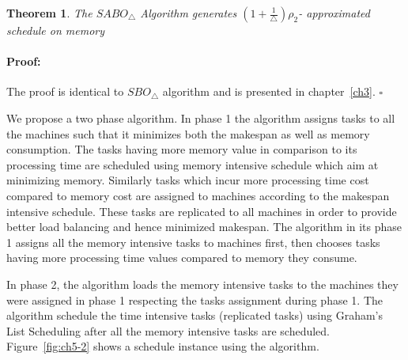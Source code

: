 \documentclass[12pt]{article}
\theoremstyle{mystyle}
\newtheorem{theorem}{Theorem}
\newenvironment{myproof}{\paragraph{Proof:}}{\hfill$\square$}
\begin{document}
      \begin{theorem} \label{th:chapter5-2b}
        The $SABO_\triangle$ Algorithm generates $ (1+\frac{1}{\triangle})\rho_2 $- approximated schedule on memory 
         \end{theorem}                      
         \begin{myproof}  
         The proof is identical to $SBO_\triangle$ algorithm and is presented in chapter~\ref{ch3}.                                           
         \end{myproof}    
    
    We propose a two phase algorithm. In phase 1 the algorithm assigns tasks to all the machines such that it minimizes both the makespan as well as memory consumption. The tasks having more memory value  in comparison to its processing time are scheduled using memory intensive schedule which aim at minimizing memory.  Similarly tasks which incur more processing time cost compared to memory cost are assigned to machines according to the makespan intensive schedule. These   tasks are replicated to all machines in order to provide better load balancing and hence minimized makespan. The algorithm in its phase 1 assigns all the memory intensive tasks to machines first, then chooses tasks having more processing time values compared to memory they consume.
    
    In phase 2, the algorithm loads the memory intensive  tasks to the machines they were assigned in phase 1 respecting the tasks assignment during phase 1. The algorithm schedule the time intensive tasks (replicated tasks) using Graham's List Scheduling after all the memory intensive tasks are scheduled. Figure~\ref{fig:ch5-2} shows a schedule instance using the algorithm.\\
    
\end{document}
